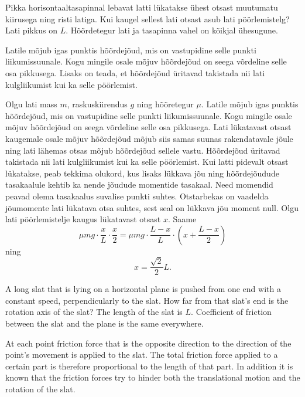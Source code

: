 
Pikka horisontaaltasapinnal lebavat latti lükatakse ühest otsast muutumatu kiirusega ning risti latiga. Kui kaugel sellest lati otsast asub lati pöörlemistelg? Lati pikkus on $L$. Hõõrdetegur lati ja tasapinna vahel on kõikjal ühesugune.

\hint
Latile mõjub igas punktis hõõrdejõud, mis on vastupidine selle punkti liikumissuunale. Kogu mingile osale mõjuv hõõrdejõud on seega võrdeline selle osa pikkusega. Lisaks on teada, et hõõrdejõud üritavad takistada nii lati kulgliikumist kui ka selle pöörlemist.

\solu
Olgu lati mass $m$, raskuskiirendus $g$ ning hõõretegur $\mu$. Latile mõjub igas punktis hõõrdejõud, mis on vastupidine selle punkti liikumissuunale. Kogu mingile osale mõjuv hõõrdejõud on seega võrdeline selle osa pikkusega. Lati lükatavast otsast kaugemale osale mõjuv hõõrdejõud mõjub siis samas suunas rakendatavale jõule ning lati lähemas otsas mõjub hõõrdejõud sellele vastu. Hõõrdejõud üritavad takistada nii lati kulgliikumist kui ka selle pöörlemist. Kui latti pidevalt otsast lükatakse, peab tekkima olukord, kus lisaks lükkava jõu ning hõõrdejõudude tasakaalule kehtib ka nende jõudude momentide tasakaal. Need momendid peavad olema tasakaalus suvalise punkti suhtes. Otstarbekas on vaadelda jõumomente lati lükatava otsa suhtes, sest seal on lükkava jõu moment null. Olgu lati pöörlemistelje kaugus lükatavast otsast $x$. Saame
\[
\mu mg \cdot \frac{x}{L} \cdot \frac{x}{2}=\mu mg \cdot \frac{L-x}{L} \cdot \left(x+\frac{L-x}{2}\right)
\]
ning
\[
x=\frac{\sqrt{2}}{2}L.
\]

A long slat that is lying on a horizontal plane is pushed from one end with a constant speed, perpendicularly to the slat. How far from that slat’s end is the rotation axis of the slat? The length of the slat is $L$. Coefficient of friction between the slat and the plane is the same everywhere.

\hinteng
At each point friction force that is the opposite direction to the direction of the point’s movement is applied to the slat. The total friction force applied to a certain part is therefore proportional to the length of that part. In addition it is known that the friction forces try to hinder both the translational motion and the rotation of the slat.

